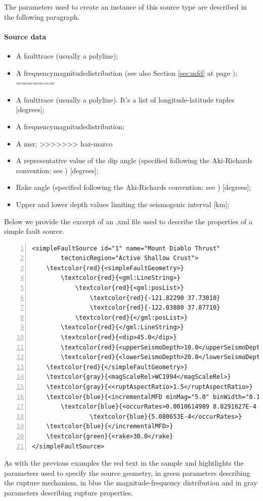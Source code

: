 \begin{itemize}
The parameters used to create an instance of this 
source type are described in the following paragraph.
%
\paragraph{Source data}
%
\begin{itemize}
<<<<<<< HEAD
\item A \gls{faulttrace} (usually a polyline); 
\item A \gls{frequencymagnitudedistribution} (see also Section 
    \ref{sec:mfd} at page \pageref{sec:mfd});
=======
\item A \gls{faulttrace} (usually a polyline). It's a list of 
	longitude-latitude tuples [degrees]; 
\item A \gls{frequencymagnitudedistribution};
\item A \gls{msr};
>>>>>>> haz-marco
\item A representative value of the dip angle (specified following 
the Aki-Richards convention; see \citet{aki2002}) [degrees];
\item Rake angle (specified following the Aki-Richards convention; 
see \citet{aki2002}) [degrees]; 
\item Upper and lower depth values limiting the seismogenic interval [km]; 
\end{itemize} 
Below we provide the excerpt of an .xml file used to describe the 
properties of a simple fault source.
\begin{Verbatim}[frame=single, commandchars=\\\{\}, fontsize=\footnotesize,
    numbers=left, numbersep=2pt]
<simpleFaultSource id="1" name="Mount Diablo Thrust" 
		tectonicRegion="Active Shallow Crust">
    \textcolor{red}{<simpleFaultGeometry>}
        \textcolor{red}{<gml:LineString>}
            \textcolor{red}{<gml:posList>}
                \textcolor{red}{-121.82290 37.73010}
                \textcolor{red}{-122.03880 37.87710}
            \textcolor{red}{</gml:posList>}
        \textcolor{red}{</gml:LineString>}
        \textcolor{red}{<dip>45.0</dip>}
        \textcolor{red}{<upperSeismoDepth>10.0</upperSeismoDepth>}
        \textcolor{red}{<lowerSeismoDepth>20.0</lowerSeismoDepth>}
    \textcolor{red}{</simpleFaultGeometry>}
    \textcolor{gray}{<magScaleRel>WC1994</magScaleRel>}
    \textcolor{gray}{<<ruptAspectRatio>1.5</ruptAspectRatio>}
    \textcolor{blue}{<incrementalMFD minMag="5.0" binWidth="0.1">}
        \textcolor{blue}{<occurRates>0.0010614989 8.8291627E-4 7.3437777E-4 6.108288E-4 }
				\textcolor{blue}{5.080653E-4</occurRates>}
    \textcolor{blue}{</incrementalMFD>}
    \textcolor{green}{<rake>30.0</rake}
</simpleFaultSource>
\end{Verbatim}
\label{example_incremental_mfd}
As with the previous examples the red text in the sample xml hightlights 
the parameters used to specify the source geometry, in green parameters 
describing the rupture mechanism, in blue the magnitude-frequency 
distribution and in gray parameters describing rupture properties. 
%

\end{itemize}
